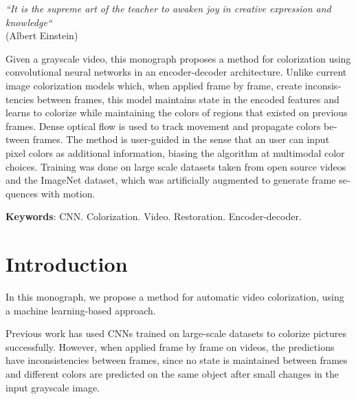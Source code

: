 \documentclass[12pt,openright,oneside,a4paper,english]{abntex2}
\begin{document}
\begin{otherlanguage}{english}
\begin{epigrafe}
\begin{flushright}
\textit{``It is the supreme art of the teacher to awaken joy in creative expression and knowledge``}\\
(Albert Einstein)
\par\end{flushright}\end{epigrafe} %

\begin{resumo}
Given a grayscale video, this monograph proposes a method for colorization using convolutional neural networks in an encoder-decoder architecture. Unlike current image colorization models which, when applied frame by frame, create inconsistencies between frames, this model maintains state in the encoded features and learns to colorize while maintaining the colors of regions that existed on previous frames. Dense optical flow is used to track movement and propagate colors between frames. The method is user-guided in the sense that an user can input pixel colors as additional information, biasing the algorithm at multimodal color choices. Training was done on large scale datasets taken from open source videos and the ImageNet dataset, which was artificially augmented to generate frame sequences with motion.
\vspace{\onelineskip}

\noindent
\textbf{Keywords}: CNN. Colorization. Video. Restoration. Encoder-decoder.
\end{resumo}


\cleardoublepage
\listoffigures
\newpage
\listoftables
\newpage
\tableofcontents

\maketitle

\chapter{Introduction}
In this monograph, we propose a method for automatic video colorization, using a machine learning-based approach.

Previous work \cite{colorful} has used CNNs trained on large-scale datasets to colorize pictures successfully. However, when applied frame by frame on videos, the predictions have inconsistencies between frames, since no state is maintained between frames and different colors are predicted on the same object after small changes in the input grayscale image.


\end{otherlanguage}
\end{document}

